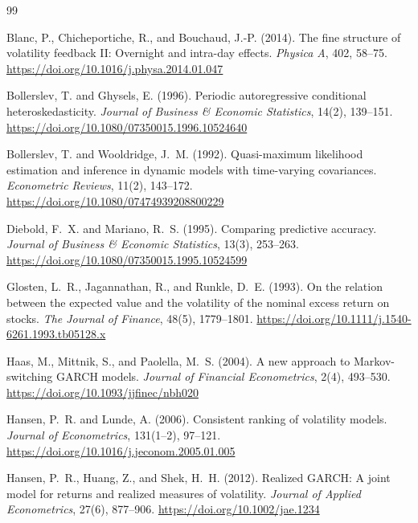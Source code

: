 \documentclass[11pt,a4paper]{article}
\begin{document}
\begin{thebibliography}{99}

Blanc, P., Chicheportiche, R., and Bouchaud, J.-P. (2014).
\newblock The fine structure of volatility feedback II: Overnight and intra-day effects.
\newblock \emph{Physica A}, 402, 58--75.
\newblock \url{https://doi.org/10.1016/j.physa.2014.01.047}

Bollerslev, T. and Ghysels, E. (1996).
\newblock Periodic autoregressive conditional heteroskedasticity.
\newblock \emph{Journal of Business \& Economic Statistics}, 14(2), 139--151.
\newblock \url{https://doi.org/10.1080/07350015.1996.10524640}

Bollerslev, T. and Wooldridge, J.~M. (1992).
\newblock Quasi-maximum likelihood estimation and inference in dynamic models with time-varying covariances.
\newblock \emph{Econometric Reviews}, 11(2), 143--172.
\newblock \url{https://doi.org/10.1080/07474939208800229}

Diebold, F.~X. and Mariano, R.~S. (1995).
\newblock Comparing predictive accuracy.
\newblock \emph{Journal of Business \& Economic Statistics}, 13(3), 253--263.
\newblock \url{https://doi.org/10.1080/07350015.1995.10524599}

Glosten, L.~R., Jagannathan, R., and Runkle, D.~E. (1993).
\newblock On the relation between the expected value and the volatility of the nominal excess return on stocks.
\newblock \emph{The Journal of Finance}, 48(5), 1779--1801.
\newblock \url{https://doi.org/10.1111/j.1540-6261.1993.tb05128.x}

Haas, M., Mittnik, S., and Paolella, M.~S. (2004).
\newblock A new approach to Markov-switching GARCH models.
\newblock \emph{Journal of Financial Econometrics}, 2(4), 493--530.
\newblock \url{https://doi.org/10.1093/jjfinec/nbh020}

Hansen, P.~R. and Lunde, A. (2006).
\newblock Consistent ranking of volatility models.
\newblock \emph{Journal of Econometrics}, 131(1--2), 97--121.
\newblock \url{https://doi.org/10.1016/j.jeconom.2005.01.005}

Hansen, P.~R., Huang, Z., and Shek, H.~H. (2012).
\newblock Realized GARCH: A joint model for returns and realized measures of volatility.
\newblock \emph{Journal of Applied Econometrics}, 27(6), 877--906.
\newblock \url{https://doi.org/10.1002/jae.1234}


\end{thebibliography}
\end{document}
